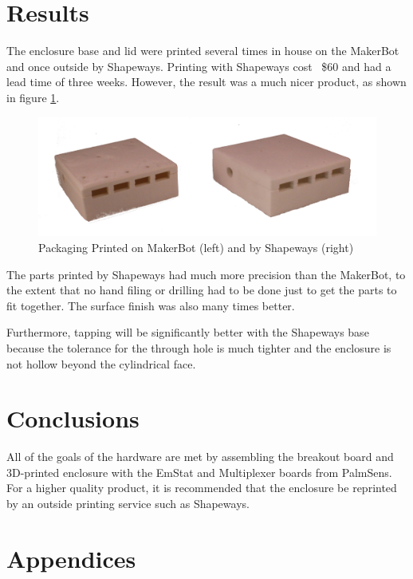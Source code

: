\documentclass[DIV=calc, paper=letterpaper, fontsize=11pt, twocolumn]{scrartcl}	 %
\begin{document}
\newpage

\section*{Results}

The enclosure base and lid were printed several times in house on the MakerBot and once outside by Shapeways.
Printing with Shapeways cost ~\$60 and had a lead time of three weeks.
However, the result was a much nicer product, as shown in figure \ref{print-comparison}.

\begin{figure}[ht]
\centering
\includegraphics[width=1\columnwidth]{packaging-comparison}
\caption{Packaging Printed on MakerBot (left) and by Shapeways (right)}
\label{print-comparison}
\end{figure}

The parts printed by Shapeways had much more precision than the MakerBot,
to the extent that no hand filing or drilling had to be done just to get the parts to fit together.
The surface finish was also many times better.

Furthermore, tapping will be significantly better with the Shapeways base because the tolerance
for the through hole is much tighter and the enclosure is not hollow beyond the cylindrical face.

\section*{Conclusions}

All of the goals of the hardware are met by assembling the breakout board and 3D-printed
enclosure with the EmStat and Multiplexer boards from PalmSens.
For a higher quality product, it is recommended that the enclosure be reprinted
by an outside printing service such as Shapeways.


\newpage
\section*{Appendices}
\end{document}
